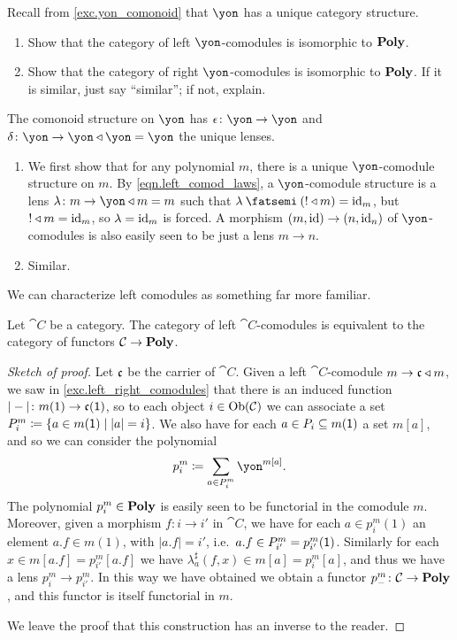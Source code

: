 \documentclass[Book-Poly]{subfiles}
\begin{document}
\begin{exercise}\label{exc.unique_yon_comodule}
Recall from \cref{exc.yon_comonoid} that $\yon$ has a unique category structure.
\begin{enumerate}
	\item Show that the category of left $\yon$-comodules is isomorphic to $\mathbf{Poly}$.
	\item Show that the category of right $\yon$-comodules is isomorphic to $\mathbf{Poly}$. If it is similar, just say ``similar''; if not, explain.
\end{enumerate}
\begin{solution}
The comonoid structure on $\yon$ has $\epsilon\colon\yon\to\yon$ and $\delta\colon\yon\to\yon\tri\yon=\yon$ the unique lenses.
\begin{enumerate}
	\item We first show that for any polynomial $m$, there is a unique $\yon$-comodule structure on $m$. By \eqref{eqn.left_comod_laws}, a $\yon$-comodule structure is a lens $\lambda\colon m\to\yon\tri m=m$ such that $\lambda\then(!\tri m)=\id_m$, but $!\mathbin{\triangleleft} m=\mathrm{id}_m$, so $\lambda=\mathrm{id}_m$ is forced. A morphism $(m,\mathrm{id})\to(n,\mathrm{id}_n)$ of $\yon$-comodules is also easily seen to be just a lens $m\to n$.
	\item Similar.
\end{enumerate}
\end{solution}
\end{exercise}

We can characterize left comodules as something far more familiar.

\begin{proposition} \label{prop.left_comod}
Let $\cat{C}$ be a category.
The category of left $\cat{C}$-comodules is equivalent to the category of functors $\mathcal{C}\to\mathbf{Poly}$.
\end{proposition}
\begin{proof}[Sketch of proof]
Let $\mathfrak{c}$ be the carrier of $\cat{C}$. Given a left $\cat{C}$-comodule $m\to \mathfrak{c}\mathbin{\triangleleft} m$, we saw in \cref{exc.left_right_comodules} that there is an induced function $|-|\colon m(1)\to\mathfrak{c}(\textsf{1})$, so to each object $i\in\operatorname{Ob}(\mathcal{C})$ we can associate a set $P^m_i\coloneqq\{a\in m(\textsf{1})\mid |a|=i\}$. We also have for each $a\in P_i\subseteq m(\textsf{1})$ a set $m[a]$, and so we can consider the polynomial
\[
p^m_i\coloneqq\sum_{a\in P^m_i}\yon^{m[a]}.
\]
The polynomial $p^m_i\in\mathbf{Poly}$ is easily seen to be functorial in the comodule $m$. Moreover, given a morphism $f\colon i\to i'$ in $\cat{C}$, we have for each $a\in p^m_i(1)$ an element $a.f\in m(1)$, with $|a.f|=i'$, i.e.\ $a.f\in  P^m_{i'}=p^m_{i'}(\textsf{1})$. Similarly for each $x\in m[a.f]=p^m_{i'}[a.f]$ we have $\lambda_a^\sharp(f,x)\in m[a]=p^m_i[a]$, and thus we have a lens $p^m_i\to p^m_{i'}$. In this way we have obtained we obtain a functor $p^m_-\colon\mathcal{C}\to\mathbf{Poly}$, and this functor is itself functorial in $m$.

We leave the proof that this construction has an inverse to the reader.
\end{proof}
\end{document}

